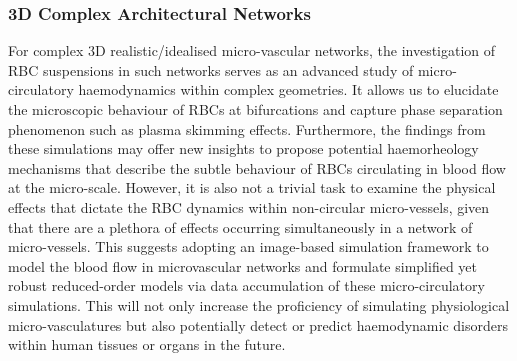 \subsubsection{3D Complex Architectural Networks}
\noindent For complex 3D realistic/idealised micro-vascular networks, the investigation of RBC suspensions in such networks serves as an advanced study of micro-circulatory haemodynamics within complex geometries. It allows us to elucidate the microscopic behaviour of RBCs at bifurcations and capture phase separation phenomenon such as plasma skimming effects.\cite{Krogh1921, PRIES198981} Furthermore, the findings from these simulations may offer new insights to propose potential haemorheology mechanisms that describe the subtle behaviour of RBCs circulating in blood flow at the micro-scale. However, it is also not a trivial task to examine the physical effects that dictate the RBC dynamics within non-circular micro-vessels, given that there are a plethora of effects occurring simultaneously in a network of micro-vessels. This suggests adopting an image-based simulation framework\cite{2020Charles} to model the blood flow in microvascular networks and formulate simplified yet robust reduced-order models via data accumulation of these micro-circulatory simulations. This will not only increase the proficiency of simulating physiological micro-vasculatures but also potentially detect or predict haemodynamic disorders within human tissues or organs in the future. 